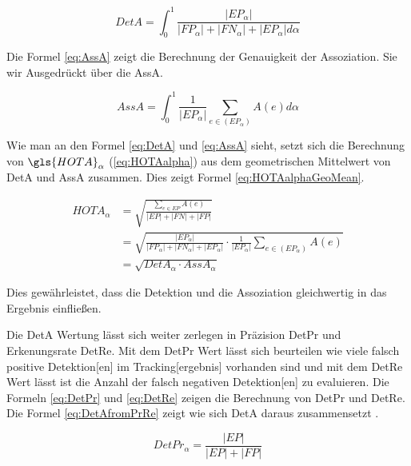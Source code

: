 \begin{equation}
    \label{eq:DetA}
    DetA = \int_{0}^{1} \frac{|EP_{\alpha}|}{|FP_{\alpha}| + |FN_{\alpha}| + |EP_{\alpha}| d\alpha}
\end{equation}

Die Formel \ref{eq:AssA} zeigt die Berechnung der Genauigkeit der \gls{Assoziation}. Sie wir Ausgedrückt über die \gls{AssA}. 

\begin{equation}
    \label{eq:AssA}
    AssA = \int_{0}^{1} \frac{1}{|EP_{\alpha}|} \sum_{e \in (EP_{\alpha})} A(e) d\alpha
\end{equation}

Wie man an den Formel \ref{eq:DetA} und \ref{eq:AssA} sieht, setzt sich die Berechnung von \(\gls{HOTA}_{\alpha}\) (\ref{eq:HOTAalpha}) aus dem geometrischen Mittelwert von \gls{DetA} und \gls{AssA} zusammen. Dies zeigt Formel \ref{eq:HOTAalphaGeoMean}.

\begin{equation}
\begin{split}
    \label{eq:HOTAalphaGeoMean}
    HOTA_{\alpha} &= \sqrt{\frac{\sum_{e \in EP} A(e)}{|EP| + |FN| + |FP|}} \\ 
    &= \sqrt{\frac{|EP_{\alpha}|}{|FP_{\alpha}| + |FN_{\alpha}| + |EP_{\alpha}|} \cdot \frac{1}{|EP_{\alpha}|} \sum_{e \in (EP_{\alpha})} A(e)} \\ 
    &= \sqrt{DetA_{\alpha} \cdot AssA_{\alpha}}
\end{split}
\end{equation}

Dies gewährleistet, dass die \gls{Detektion} und die \gls{Assoziation} gleichwertig in das Ergebnis einfließen. \par

Die \gls{DetA} Wertung lässt sich weiter zerlegen in Präzision \gls{DetPr} und Erkenungsrate \gls{DetRe}. Mit dem \gls{DetPr} Wert lässt sich beurteilen wie viele falsch positive \gls{Detektion}[en] im \gls{Tracking}[ergebnis] vorhanden sind und mit dem \gls{DetRe} Wert lässt ist die Anzahl der falsch negativen \gls{Detektion}[en] zu evaluieren. Die Formeln \ref{eq:DetPr} und \ref{eq:DetRe} zeigen die Berechnung von \gls{DetPr} und \gls{DetRe}. Die Formel \ref{eq:DetAfromPrRe} zeigt wie sich \gls{DetA} daraus zusammensetzt \cite{HOTA}.

\begin{equation}
    \label{eq:DetPr}
    DetPr_{\alpha} = \frac{|EP|}{|EP| + |FP|}
\end{equation}

